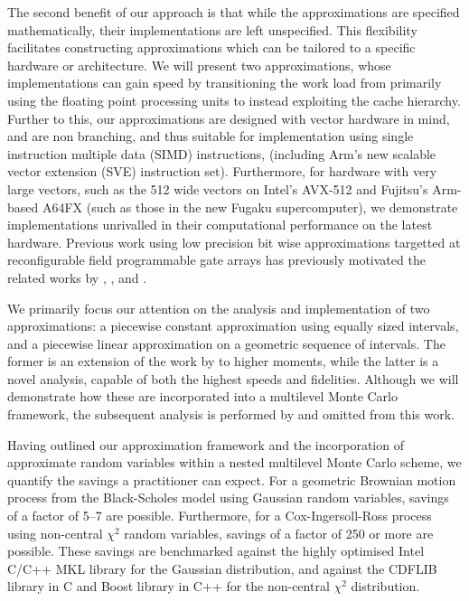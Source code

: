 \documentclass[9pt,a4paper,english]{extarticle}
\begin{document}
The second benefit of our approach is that while the approximations are  specified mathematically, their implementations are left unspecified. This flexibility facilitates constructing approximations which can be tailored to a specific hardware or architecture. We will present two approximations, whose implementations can gain speed by transitioning the work load from primarily using the floating point processing units to instead exploiting the cache hierarchy. Further to this, our approximations are designed with vector hardware in mind, and are non branching, and thus suitable for implementation using single instruction multiple data (SIMD) instructions, (including Arm's new scalable vector extension (SVE) instruction set). Furthermore, for hardware with very large vectors, such as the \SI{512}{\bit} wide vectors on Intel's AVX-512 and Fujitsu's Arm-based A64FX (such as those in the new Fugaku supercomputer), we demonstrate implementations unrivalled in their computational performance on the latest hardware. Previous work using low precision bit wise approximations targetted at reconfigurable field programmable gate arrays has previously motivated the related works by \citet{brugger2014mixed}, \citet{omland2015exploiting}, and \citet{cheung2007hardware}.

We primarily focus our attention on the analysis and implementation of two approximations: a piecewise constant approximation using equally sized intervals, and a piecewise linear approximation on a geometric sequence of intervals. The former is an extension of the work by \citet[theorem~1]{giles2019random_quadrature} to higher moments, while the latter is a novel analysis, capable of both the highest speeds and fidelities. Although we will demonstrate how these are incorporated into a multilevel Monte Carlo framework, the subsequent analysis is performed by \citeauthor{giles2020approximate} \citep{giles2020approximate,sheridan2020nested} and omitted from this work. 

Having outlined our approximation framework and the incorporation of approximate random variables within a nested multilevel Monte Carlo scheme, we quantify the savings a practitioner can expect. For a geometric Brownian motion process from the Black-Scholes model \citep{black1973pricing} using Gaussian random variables, savings of a factor of 5--7 are possible. Furthermore, for a Cox-Ingersoll-Ross process \citep{cox1985theory} using non-central $ \chi^2 $ random variables, savings of a factor of 250 or more are possible. These savings are benchmarked against the highly optimised Intel C/C++ MKL library for the Gaussian distribution, and against the CDFLIB library \citep{brown1994dcdflib,burkardt2020cdflib} in C and Boost library \citep{boost2020library} in C++ for the non-central $ \chi^2 $ distribution. 
\end{document}
